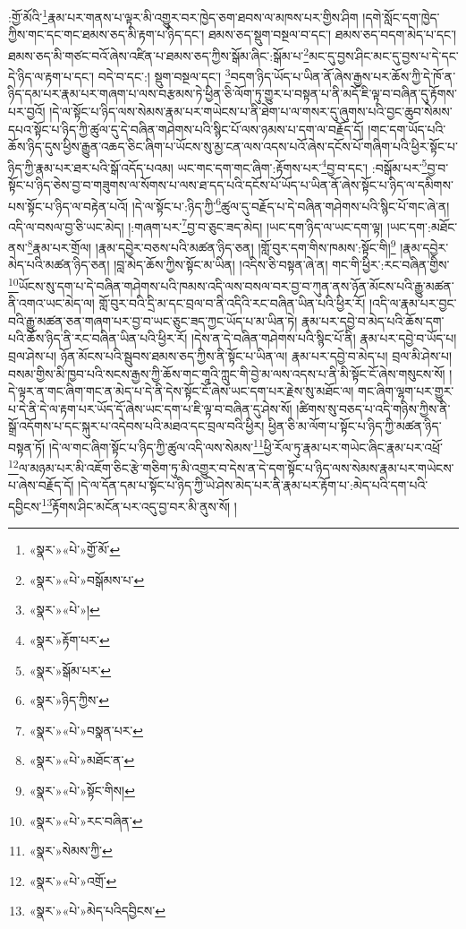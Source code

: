 :གྱོ་མོའི་\footnote{«སྣར་»«པེ་»གྱོ་མོ་}རྣམ་པར་གནས་པ་ལྟར་མི་འགྱུར་བར་ཁྱེད་ཅག་ཐབས་ལ་མཁས་པར་གྱིས་ཤིག །དགེ་སློང་དག་ཁྱེད་ཀྱིས་གང་དང་གང་ཐམས་ཅད་མི་རྟག་པ་ཉིད་དང་། ཐམས་ཅད་སྡུག་བསྔལ་བ་དང་། ཐམས་ཅད་བདག་མེད་པ་དང་། ཐམས་ཅད་མི་གཙང་བའོ་ཞེས་འཛིན་པ་ཐམས་ཅད་ཀྱིས་སྒོམ་ཞིང་:སྒོམ་པ་\footnote{«སྣར་»«པེ་»བསྒོམས་པ་}མང་དུ་བྱས་ཤིང་མང་དུ་བྱས་པ་དེ་དང་དེ་ཉིད་ལ་རྟག་པ་དང་། བདེ་བ་དང་:། སྡུག་བསྔལ་དང་། \footnote{«སྣར་»«པེ་»།  }བདག་ཉིད་ཡོད་པ་ཡིན་ནོ་ཞེས་རྒྱས་པར་ཆོས་ཀྱི་དེ་ཁོ་ན་ཉིད་དམ་པར་རྣམ་པར་གཞག་པ་ལས་བརྩམས་ཏེ་ཕྱིན་ཅི་ལོག་ཏུ་གྱུར་པ་བསྟན་པ་ནི་མདོ་ཇི་ལྟ་བ་བཞིན་དུ་རྟོགས་པར་བྱའོ། །དེ་ལ་སྟོང་པ་ཉིད་ལས་སེམས་རྣམ་པར་གཡེངས་པ་ནི་ཐེག་པ་ལ་གསར་དུ་ཞུགས་པའི་བྱང་ཆུབ་སེམས་དཔའ་སྟོང་པ་ཉིད་ཀྱི་ཚུལ་དུ་དེ་བཞིན་གཤེགས་པའི་སྙིང་པོ་ལས་ཉམས་པ་དག་ལ་བརྗོད་དོ། །གང་དག་ཡོད་པའི་ཆོས་ཉིད་དུས་ཕྱིས་རྒྱུན་འཆད་ཅིང་ཞིག་པ་ཡོངས་སུ་མྱ་ངན་ལས་འདས་པའོ་ཞེས་དངོས་པོ་གཞིག་པའི་ཕྱིར་སྟོང་པ་ཉིད་ཀྱི་རྣམ་པར་ཐར་པའི་སྒོ་འདོད་པའམ། ཡང་གང་དག་གང་ཞིག་:རྟོགས་པར་\footnote{«སྣར་»རྟོག་པར་}བྱ་བ་དང་། :བསྒོམ་པར་\footnote{«སྣར་»སྒོམ་པར་}བྱ་བ་སྟོང་པ་ཉིད་ཅེས་བྱ་བ་གཟུགས་ལ་སོགས་པ་ལས་ཐ་དད་པའི་དངོས་པོ་ཡོད་པ་ཡིན་ནོ་ཞེས་སྟོང་པ་ཉིད་ལ་དམིགས་པས་སྟོང་པ་ཉིད་ལ་བརྟེན་པའོ། །དེ་ལ་སྟོང་པ་:ཉིད་ཀྱི་\footnote{«སྣར་»ཉིད་ཀྱིས་}ཚུལ་དུ་བརྗོད་པ་དེ་བཞིན་གཤེགས་པའི་སྙིང་པོ་གང་ཞེ་ན། འདི་ལ་བསལ་བྱ་ཅི་ཡང་མེད། །:གཞག་པར་\footnote{«སྣར་»«པེ་»བསྣན་པར་}བྱ་བ་ཅུང་ཟད་མེད། །ཡང་དག་ཉིད་ལ་ཡང་དག་ལྟ། །ཡང་དག་:མཐོང་ནས་\footnote{«སྣར་»«པེ་»མཐོང་ན་}རྣམ་པར་གྲོལ། །རྣམ་དབྱེར་བཅས་པའི་མཚན་ཉིད་ཅན། །གློ་བུར་དག་གིས་ཁམས་:སྟོང་གི།\footnote{«སྣར་»«པེ་»སྟོང་གིས།} །རྣམ་དབྱེར་མེད་པའི་མཚན་ཉིད་ཅན། །བླ་མེད་ཆོས་ཀྱིས་སྟོང་མ་ཡིན། །འདིས་ཅི་བསྟན་ཞེ་ན། གང་གི་ཕྱིར་:རང་བཞིན་གྱིས་\footnote{«སྣར་»«པེ་»རང་བཞིན་}ཡོངས་སུ་དག་པ་དེ་བཞིན་གཤེགས་པའི་ཁམས་འདི་ལས་བསལ་བར་བྱ་བ་ཀུན་ནས་ཉོན་མོངས་པའི་རྒྱུ་མཚན་ནི་འགའ་ཡང་མེད་ལ། གློ་བུར་བའི་དྲི་མ་དང་བྲལ་བ་ནི་འདིའི་རང་བཞིན་ཡིན་པའི་ཕྱིར་རོ། །འདི་ལ་རྣམ་པར་བྱང་བའི་རྒྱུ་མཚན་ཅན་གཞག་པར་བྱ་བ་ཡང་ཅུང་ཟད་ཀྱང་ཡོད་པ་མ་ཡིན་ཏེ། རྣམ་པར་དབྱེ་བ་མེད་པའི་ཆོས་དག་པའི་ཆོས་ཉིད་ནི་རང་བཞིན་ཡིན་པའི་ཕྱིར་རོ། །དེས་ན་དེ་བཞིན་གཤེགས་པའི་སྙིང་པོ་ནི། རྣམ་པར་དབྱེ་བ་ཡོད་པ། བྲལ་ཤེས་པ། ཉོན་མོངས་པའི་སྦུབས་ཐམས་ཅད་ཀྱིས་ནི་སྟོང་པ་ཡིན་ལ། རྣམ་པར་དབྱེ་བ་མེད་པ། བྲལ་མི་ཤེས་པ། བསམ་གྱིས་མི་ཁྱབ་པའི་སངས་རྒྱས་ཀྱི་ཆོས་གང་གཱའི་ཀླུང་གི་བྱེ་མ་ལས་འདས་པ་ནི་མི་སྟོང་ངོ་ཞེས་གསུངས་སོ། །དེ་ལྟར་ན་གང་ཞིག་གང་ན་མེད་པ་དེ་ནི་དེས་སྟོང་ངོ་ཞེས་ཡང་དག་པར་རྗེས་སུ་མཐོང་ལ། གང་ཞིག་ལྷག་པར་གྱུར་པ་དེ་ནི་དེ་ལ་རྟག་པར་ཡོད་དོ་ཞེས་ཡང་དག་པ་ཇི་ལྟ་བ་བཞིན་དུ་ཤེས་སོ། །ཚིགས་སུ་བཅད་པ་འདི་གཉིས་ཀྱིས་ནི་སྒྲོ་འདོགས་པ་དང་སྐུར་པ་འདེབས་པའི་མཐའ་དང་བྲལ་བའི་ཕྱིར། ཕྱིན་ཅི་མ་ལོག་པ་སྟོང་པ་ཉིད་ཀྱི་མཚན་ཉིད་བསྟན་ཏོ། །དེ་ལ་གང་ཞིག་སྟོང་པ་ཉིད་ཀྱི་ཚུལ་འདི་ལས་སེམས་\footnote{«སྣར་»སེམས་ཀྱི་}ཕྱི་རོལ་ཏུ་རྣམ་པར་གཡེང་ཞིང་རྣམ་པར་འཕྲོ་\footnote{«སྣར་»«པེ་»འགྲོ་}ལ་མཉམ་པར་མི་འཇོག་ཅིང་རྩེ་གཅིག་ཏུ་མི་འགྱུར་བ་དེས་ན་དེ་དག་སྟོང་པ་ཉིད་ལས་སེམས་རྣམ་པར་གཡེངས་པ་ཞེས་བརྗོད་དོ། །དེ་ལ་དོན་དམ་པ་སྟོང་པ་ཉིད་ཀྱི་ཡེ་ཤེས་མེད་པར་ནི་རྣམ་པར་རྟོག་པ་:མེད་པའི་དག་པའི་དབྱིངས་\footnote{«སྣར་»«པེ་»མེད་པའིདབྱིངས་}རྟོགས་ཤིང་མངོན་པར་འདུ་བྱ་བར་མི་ནུས་སོ། །
